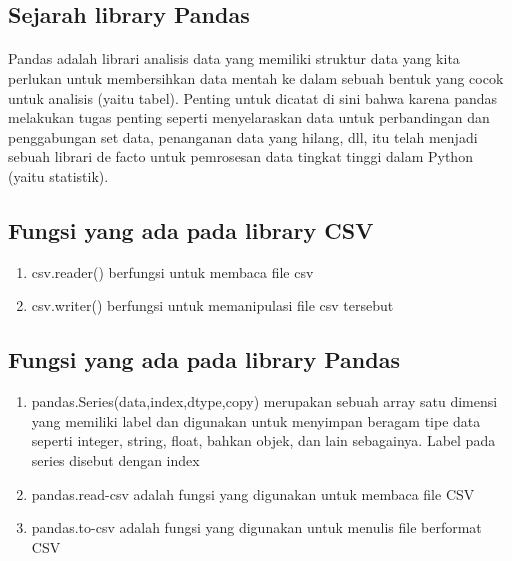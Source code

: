 \documentclass{article}
\begin{document}
\subsection{Sejarah library Pandas}
\paragraph{}
Pandas adalah librari analisis data yang memiliki struktur data yang kita perlukan untuk membersihkan data mentah ke dalam sebuah bentuk yang cocok untuk analisis (yaitu tabel). Penting untuk dicatat di sini bahwa karena pandas melakukan tugas penting seperti menyelaraskan data untuk perbandingan dan penggabungan set data, penanganan data yang hilang, dll, itu telah menjadi sebuah librari de facto untuk pemrosesan data tingkat tinggi dalam Python (yaitu statistik).
\subsection{Fungsi yang ada pada library CSV}
\begin{enumerate}
    \item csv.reader() berfungsi untuk membaca file csv
    \item csv.writer() berfungsi untuk memanipulasi file csv tersebut
\end{enumerate}
\subsection{Fungsi yang ada pada library Pandas}
\begin{enumerate}
    \item pandas.Series(data,index,dtype,copy) merupakan sebuah array satu dimensi yang memiliki label dan digunakan untuk menyimpan beragam tipe data seperti integer, string, float, bahkan objek, dan lain sebagainya. Label pada series disebut dengan index
    \item pandas.read-csv adalah fungsi yang digunakan untuk membaca file CSV
    \item pandas.to-csv adalah fungsi yang digunakan untuk menulis file berformat CSV
\end{enumerate}
\newpage
\end{document}
